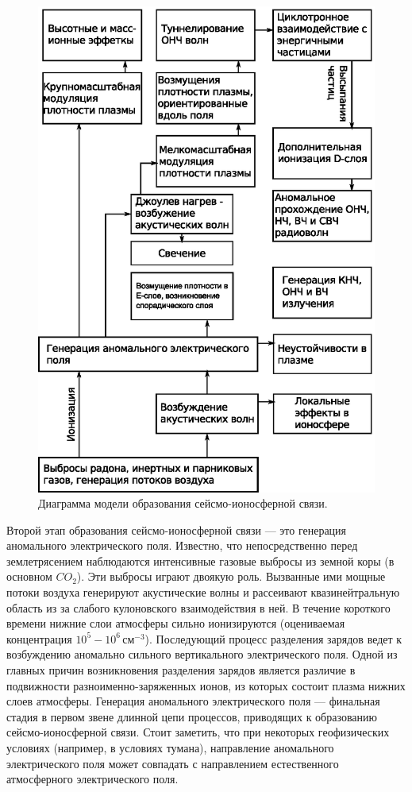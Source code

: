 \documentclass[12pt, oneside, a4paper]{article}
\begin{document}
\begin{figure}[H]
    \centering
    \includegraphics*[width=0.8\columnwidth]{process-chain}
    \caption{Диаграмма модели образования сейсмо-ионосферной связи.}
    \label{fig:process-chain}
\end{figure}

Второй этап образования сейсмо-ионосферной связи --- это генерация аномального электрического поля. Известно, что непосредственно перед землетрясением наблюдаются интенсивные газовые выбросы из земной коры (в основном $CO_2$). Эти выбросы играют двоякую роль. Вызванные ими мощные потоки воздуха генерируют акустические волны и рассеивают квазинейтральную область из за слабого кулоновского взаимодействия в ней. В  течение короткого времени нижние слои атмосферы сильно ионизируются (оцениваемая концентрация $10^5-10^6$\,см$^{-3}$). Последующий процесс разделения зарядов ведет к возбуждению аномально сильного вертикального электрического поля. Одной из главных причин возникновения разделения зарядов является различие в подвижности разноименно-заряженных ионов, из которых состоит плазма нижних слоев атмосферы. Генерация аномального электрического поля --- финальная стадия в первом звене длинной цепи процессов, приводящих к образованию сейсмо-ионосферной связи. Стоит заметить, что при некоторых геофизических условиях (например, в условиях тумана), направление аномального электрического поля может совпадать с направлением естественного атмосферного электрического поля.
\end{document}
